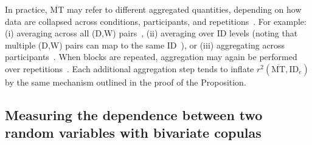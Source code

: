 \documentclass[acmlarge, manuscript,review]{acmart}
\newcommand{\mmt}{\ensuremath{\overline{\mt}}\xspace}
\newcommand{\mt}{\ensuremath{{\text{MT}}}\xspace}
\newcommand{\ide}{\ensuremath{{\text{ID}_e}}\xspace}
\begin{document}
In practice, \mmt may refer to different aggregated quantities, depending on how data are collapsed across conditions, participants, and repetitions~\cite{olafsdottir2012}. For example: (i) averaging across all (D,W) pairs~\cite{soukoreff2004}, (ii) averaging over ID levels (noting that multiple (D,W) pairs can map to the same ID~\cite{gori2018chi}), or (iii) aggregating across participants~\cite{accot1997,mackenzie2008}. When blocks are repeated, aggregation may again be performed over repetitions~\cite{jude2016,guiard2011}. Each additional aggregation step tends to inflate 
$r^2(\mmt,\ide)$ by the same mechanism outlined in the proof of the Proposition.


\subsection{Measuring the dependence between two random variables with bivariate copulas\label{sec:copula}}



\end{document}
